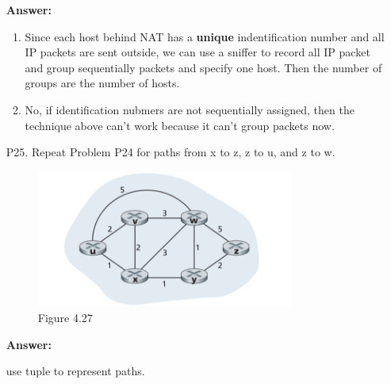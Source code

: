 \begin{enumerate}
    \textbf{Answer:}

    \begin{enumerate}
        \item Since each host behind NAT has a \textbf{unique} indentification number and all IP packets are sent outside, we can use a sniffer to record all IP packet and group sequentially packets and specify one host. Then the number of groups are the number of hosts.
        \item No, if identification nubmers are not sequentially assigned, then the technique above can't work because it can't group packets now.
    \end{enumerate}

    \item[P25.] Repeat Problem P24 for paths from x to z, z to u, and z to w.

    \begin{figure}[H]
        \centering
        \includegraphics[width=0.8\textwidth]{4th/4-27.png}
        \caption{Figure 4.27}
        \label{fig:4_27}
    \end{figure}

    \textbf{Answer:}

    use tuple to represent paths.


\end{enumerate}
